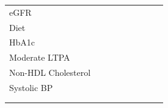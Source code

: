 \documentclass[12pt,leqno,titlepage]{amsart}
\newcommand{\1}{\mathbbm{1}}
\begin{document}
\begin{bibunit}
\begin{table}[htbp]
{\begin{tabular}{lcccccccc}
\hspace{1.2em}eGFR &  & \cellcolor{gray!25} &  & \cellcolor{gray!25} &  & \cellcolor{gray!25} &  & \cellcolor{gray!25} \\
\hspace{1.2em}Diet &  & \cellcolor{gray!25} &  & \cellcolor{gray!25} &  & \cellcolor{gray!25} &  & \cellcolor{gray!25} \\
\hspace{1.2em}HbA1c &  & \cellcolor{gray!25} &  & \cellcolor{gray!25} &  & \cellcolor{gray!25} &  & \cellcolor{gray!25} \\
\hspace{1.2em}Moderate LTPA &  & \cellcolor{gray!25} &  & \cellcolor{gray!25} &  & \cellcolor{gray!25} &  & \cellcolor{gray!25} \\
\hspace{1.2em}Non-HDL Cholesterol &  & \cellcolor{gray!25} &  & \cellcolor{gray!25} &  & \cellcolor{gray!25} &  & \cellcolor{gray!25} \\
\hspace{1.2em}Systolic BP &  & \cellcolor{gray!25} &  & \cellcolor{gray!25} &  & \cellcolor{gray!25} &  & \cellcolor{gray!25} \\
\noalign{\global\def\arraystretch{0.05}}
\rule{0pt}{0.01ex} & \rule{0pt}{0.01ex} & \cellcolor{gray!25}\rule{0pt}{0.01ex} & \rule{0pt}{0.01ex} & \cellcolor{gray!25}\rule{0pt}{0.01ex} & \rule{0pt}{0.01ex} & \cellcolor{gray!25}\rule{0pt}{0.01ex} & \rule{0pt}{0.01ex} & \cellcolor{gray!25}\rule{0pt}{0.01ex} \\
\noalign{\global\def\arraystretch{1}}
\bottomrule
\end{tabular}%
}

\end{table}





\end{bibunit}
\end{document}
